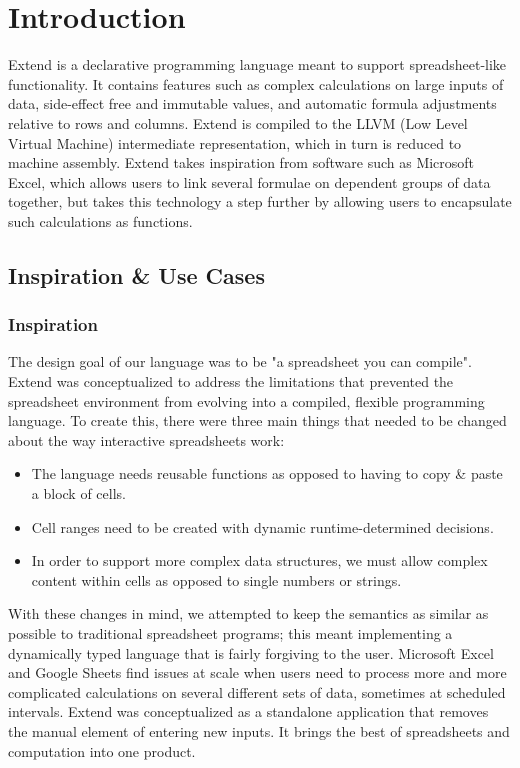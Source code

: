 \chapter{Introduction}
Extend is a declarative programming language meant to support spreadsheet-like functionality. It contains features such as complex calculations on large inputs of data, side-effect free and immutable values, and automatic formula adjustments relative to rows and columns. Extend is compiled to the LLVM (Low Level Virtual Machine) intermediate representation, which in turn is reduced to machine assembly. Extend takes inspiration from software such as Microsoft Excel, which allows users to link several formulae on dependent groups of data together, but takes this technology a step further by allowing users to encapsulate such calculations as functions.

\section{Inspiration \& Use Cases}

	\subsection{Inspiration}
	The design goal of our language was to be "a spreadsheet you can compile". Extend was conceptualized to address the limitations that prevented the spreadsheet environment from evolving into a compiled, flexible programming language. To create this, there were three main things that needed to be changed about the way interactive spreadsheets work:
		\begin{itemize}
			\item The language needs reusable functions as opposed to having to copy \& paste a block of cells.
			\item Cell ranges need to be created with dynamic runtime-determined decisions.
			\item In order to support more complex data structures, we must allow complex content within cells as opposed to single numbers or strings.
		\end{itemize}
	With these changes in mind, we attempted to keep the semantics as similar as possible to traditional spreadsheet programs; this meant implementing a dynamically typed language that is fairly forgiving to the user.
	\newline \newline
	Microsoft Excel and Google Sheets find issues at scale when users need to process more and more complicated calculations on several different sets of data, sometimes at scheduled intervals. Extend was conceptualized as a standalone application that removes the manual element of entering new inputs. It brings the best of spreadsheets and computation into one product.


